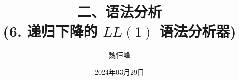 \documentclass[]{beamer}
\title[语法分析]{二、语法分析 \\ (6. 递归下降的 $LL(1)$ 语法分析器)}
\author[魏恒峰]{\large 魏恒峰}
\institute{hfwei@nju.edu.cn}
\date{2024年03月29日}
\begin{document}
\maketitle




\thankyou{}

\end{document}
